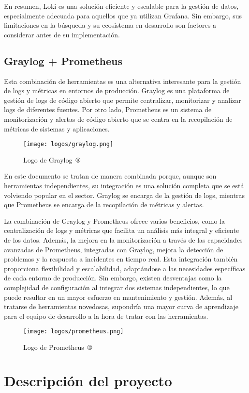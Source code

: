En resumen, Loki es una solución eficiente y escalable para la gestión de datos,
especialmente adecuada para aquellos que ya utilizan Grafana. Sin embargo, sus
limitaciones en la búsqueda y su ecosistema en desarrollo son factores a
considerar antes de su implementación.


\subsection{Graylog + Prometheus}
Esta combinación de herramientas es una alternativa interesante para la gestión
de logs y métricas en entornos de producción. Graylog es una plataforma de
gestión de logs de código abierto que permite centralizar, monitorizar y
analizar logs de diferentes fuentes. Por otro lado, Prometheus es un sistema de
monitorización y alertas de código abierto que se centra en la recopilación de
métricas de sistemas y aplicaciones.

\begin{figure}[H]
	\centering
	\texttt{[image: logos/graylog.png]}
	\caption{Logo de Graylog~®}
\end{figure}

En este documento se tratan de manera combinada porque, aunque son herramientas
independientes, su integración es una solución completa que se está volviendo
popular en el sector. Graylog se encarga de la gestión de logs, mientras que
Prometheus se encarga de la recopilación de métricas y alertas.

La combinación de Graylog y Prometheus ofrece varios beneficios, como la
centralización de logs y métricas que facilita un análisis más integral y
eficiente de los datos. Además, la mejora en la monitorización a través de las
capacidades avanzadas de Prometheus, integradas con Graylog, mejora la detección
de problemas y la respuesta a incidentes en tiempo real. Esta integración
también proporciona flexibilidad y escalabilidad, adaptándose a las necesidades
específicas de cada entorno de producción. Sin embargo, existen desventajas como
la complejidad de configuración al integrar dos sistemas independientes, lo que
puede resultar en un mayor esfuerzo en mantenimiento y gestión. Además, al
tratarse de herramientas novedosas, supondría una mayor curva de aprendizaje
para el equipo de desarrollo a la hora de tratar con las herramientas.

\begin{figure}[H]
	\centering
	\texttt{[image: logos/prometheus.png]}
	\caption{Logo de Prometheus~®}
\end{figure}


\newpage{}
\section{Descripción del proyecto}\label{sec:descripcion}
